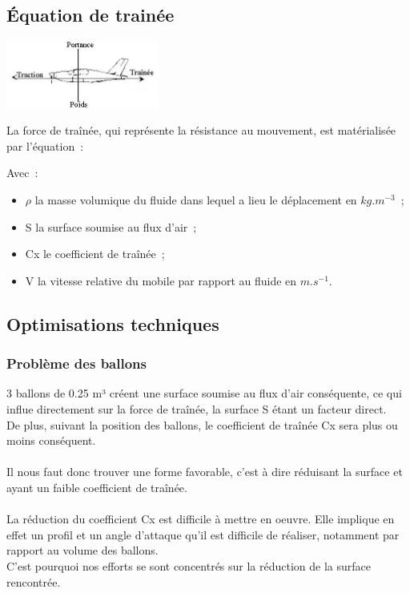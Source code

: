 \documentclass[a4paper,11pt]{article}
\begin{document}
\subsection{Équation de trainée}
	\begin{center}
		\includegraphics[width=5cm]{../Images/portance.jpg}
	\end{center}
	La force de traînée, qui représente la résistance au mouvement, est matérialisée par l'équation~:\\
  \begin{center}
  \end{center}
  Avec~:
  \begin{itemize}
   \item $\rho$ la masse volumique du fluide dans lequel a lieu le déplacement en $kg.m^{-3}$~;
   \item S la surface soumise au flux d'air~;
   \item Cx le coefficient de traînée~;
   \item V la vitesse relative du mobile par rapport au fluide en $m.s^{-1}$.
  \end{itemize}

\subsection{Optimisations techniques}
\subsubsection{Problème des ballons}
	3 ballons de 0.25 m³ créent une surface soumise au flux d'air conséquente, ce qui influe directement sur la force de traînée, la surface S étant un facteur direct.\\
	De plus, suivant la position des ballons, le coefficient de traînée Cx sera plus ou moins conséquent.\\
	\\
	Il nous faut donc trouver une forme favorable, c'est à dire réduisant la surface et ayant un faible coefficient de traînée.\\
	\\
	La réduction du coefficient Cx est difficile à mettre en oeuvre. Elle implique en effet un profil et un angle d'attaque qu'il est difficile de réaliser, notamment par rapport au volume des ballons.\\
	C'est pourquoi nos efforts se sont concentrés sur la réduction de la surface rencontrée.
\end{document}
